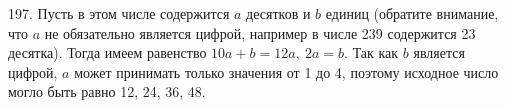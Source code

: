 197. Пусть в этом числе содержится $a$ десятков и $b$ единиц (обратите внимание, что $a$ не обязательно является цифрой, например в числе 239 содержится 23 десятка). Тогда имеем равенство $10a+b=12a,\ 2a=b.$ Так как $b$ является цифрой, $a$ может принимать только значения от 1 до 4, поэтому исходное число могло быть равно 12, 24, 36, 48.\\
